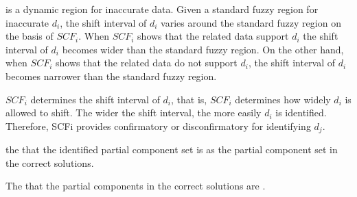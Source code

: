 \begin{defi}
 is a dynamic region for inaccurate data. Given a standard fuzzy region for inaccurate $d_i$, the shift interval of $d_i$ varies around the standard fuzzy region on the basis of $SCF_i$. When $SCF_i$ shows that the related data support $d_i$ the shift interval of $d_i$ becomes wider than the standard fuzzy region. On the other hand, when $SCF_i$ shows that the related data do not support $d_i$, the shift interval of $d_i$ becomes narrower than the standard fuzzy region.
\cite{conf/ijcai/ZhaoN95}
\end{defi}

\begin{defi}
$SCF_i$ determines the shift interval of $d_i$, that is, $SCF_i$ determines how widely $d_i$ is allowed to shift. The wider the shift interval, the more easily $d_i$ is identified. Therefore, SCFi provides confirmatory or disconfirmatory  for identifying $d_j$.
\cite{conf/ijcai/ZhaoN95}
\end{defi}

\begin{defi}
the  that the identified partial component set is  as the partial component set in the correct solutions.
\cite{conf/ijcai/ZhaoN95}
\end{defi}

\begin{defi}
The  that the partial components in the correct solutions are .
\cite{conf/ijcai/ZhaoN95}
\end{defi}